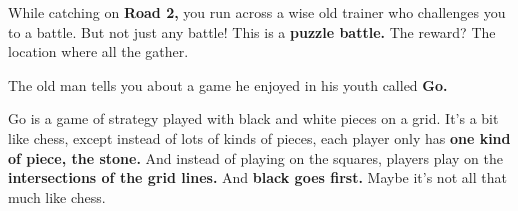 

While catching \mappMobimon{} on \textbf{Road 2,} you run across a wise old
\mappMobimon{} trainer who challenges you to a \mappMobimon{} battle. But not
just any \mappMobimon{} battle! This is a \textbf{puzzle battle.} The reward?
The location where all the \mappMobimon{} gather.

The old man tells you about a game he enjoyed in his youth called \textbf{Go.}

Go is a game of strategy played with black and white pieces on a grid. It's a
bit like chess, except instead of lots of kinds of pieces, each player only has
\textbf{one kind of piece, the stone.} And instead of playing on the squares,
players play on the \textbf{intersections of the grid lines.} And \textbf{black
  goes first.} Maybe it's not all that much like chess.


\begin{center}
  \showfullgoban
\end{center}

\cleargoban
{}
\begin{center}
  \showfullgoban
\end{center}

\cleargoban
{}
\begin{center}
  \showfullgoban
\end{center}

\cleargoban
{}
\begin{center}
  \showfullgoban
\end{center}

\cleargoban
{}
\begin{center}
  \showfullgoban
\end{center}

\cleargoban
{}
\begin{center}
  \showfullgoban
\end{center}

\cleargoban
{}
\begin{center}
  \showfullgoban
\end{center}

